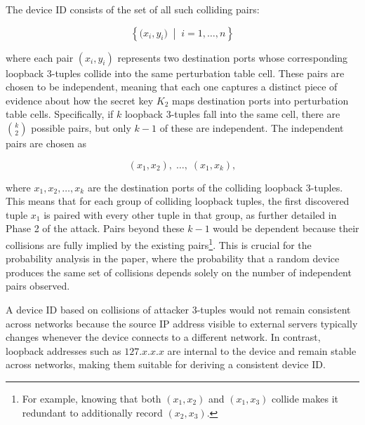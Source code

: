 \documentclass{report}
\begin{document}
The device ID consists of the set of all such colliding pairs:

\[
	\left\{ \bigl(x_i, y_i\bigr) \;\middle|\; i = 1, \ldots, n \right\}
\]

where each pair $(x_i, y_i)$ represents \alert{two destination ports} whose corresponding loopback 3-tuples collide into the same perturbation table cell. These pairs are chosen to be \alert{independent}, meaning that each one captures a distinct piece of evidence about how the secret key $K_2$ maps destination ports into perturbation table cells. Specifically, if $k$ loopback 3-tuples fall into the same cell, there are $\binom{k}{2}$ possible pairs, but only $k-1$ of these are independent. The independent pairs are chosen as

\[
	(x_1, x_2),\; \ldots,\; (x_1, x_k),
\]

where $x_1, x_2, \ldots, x_k$ are the destination ports of the colliding loopback 3-tuples. This means that for each group of colliding loopback tuples, the first discovered tuple $x_1$ is paired with every other tuple in that group, as further detailed in Phase 2 of the attack. Pairs beyond these $k-1$ would be \alert{dependent} because their collisions are fully implied by the existing pairs\footnote{For example, knowing that both $(x_1, x_2)$ and $(x_1, x_3)$ collide makes it redundant to additionally record $(x_2, x_3)$.}. This is crucial for the probability analysis in the paper, where the probability that a random device produces the same set of collisions depends solely on the number of independent pairs observed.

A device ID based on collisions of \alert{attacker 3-tuples} would not remain consistent across networks because the source IP address visible to external servers typically changes whenever the device connects to a different network. In contrast, loopback addresses such as $127.x.x.x$ are internal to the device and remain stable across networks, making them suitable for deriving a consistent device ID.

\end{document}
